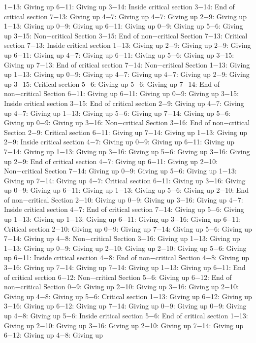 1−13: Giving up
6−11: Giving up
3−14: Inside critical section
3−14: End of critical section
7−13: Giving up
4−7: Giving up
4−7: Giving up
2−9: Giving up
1−13: Giving up
0−9: Giving up
6−11: Giving up
0−9: Giving up
5−6: Giving up
3−15: Non−critical Section
3−15: End of non−critical Section
7−13: Critical section
7−13: Inside critical section
1−13: Giving up
2−9: Giving up
2−9: Giving up
6−11: Giving up
4−7: Giving up
6−11: Giving up
5−6: Giving up
3−15: Giving up
7−13: End of critical section
7−14: Non−critical Section
1−13: Giving up
1−13: Giving up
0−9: Giving up
4−7: Giving up
4−7: Giving up
2−9: Giving up
3−15: Critical section
5−6: Giving up
5−6: Giving up
7−14: End of non−critical Section
6−11: Giving up
6−11: Giving up
0−9: Giving up
3−15: Inside critical section
3−15: End of critical section
2−9: Giving up
4−7: Giving up
4−7: Giving up
1−13: Giving up
5−6: Giving up
7−14: Giving up
5−6: Giving up
0−9: Giving up
3−16: Non−critical Section
3−16: End of non−critical Section
2−9: Critical section
6−11: Giving up
7−14: Giving up
1−13: Giving up
2−9: Inside critical section
4−7: Giving up
0−9: Giving up
6−11: Giving up
7−14: Giving up
1−13: Giving up
3−16: Giving up
5−6: Giving up
3−16: Giving up
2−9: End of critical section
4−7: Giving up
6−11: Giving up
2−10: Non−critical Section
7−14: Giving up
0−9: Giving up
5−6: Giving up
1−13: Giving up
7−14: Giving up
4−7: Critical section
6−11: Giving up
3−16: Giving up
0−9: Giving up
6−11: Giving up
1−13: Giving up
5−6: Giving up
2−10: End of non−critical Section
2−10: Giving up
0−9: Giving up
3−16: Giving up
4−7: Inside critical section
4−7: End of critical section
7−14: Giving up
5−6: Giving up
1−13: Giving up
1−13: Giving up
6−11: Giving up
3−16: Giving up
6−11: Critical section
2−10: Giving up
0−9: Giving up
7−14: Giving up
5−6: Giving up
7−14: Giving up
4−8: Non−critical Section
3−16: Giving up
1−13: Giving up
1−13: Giving up
0−9: Giving up
2−10: Giving up
2−10: Giving up
5−6: Giving up
6−11: Inside critical section
4−8: End of non−critical Section
4−8: Giving up
3−16: Giving up
7−14: Giving up
7−14: Giving up
1−13: Giving up
6−11: End of critical section
6−12: Non−critical Section
5−6: Giving up
6−12: End of non−critical Section
0−9: Giving up
2−10: Giving up
3−16: Giving up
2−10: Giving up
4−8: Giving up
5−6: Critical section
1−13: Giving up
6−12: Giving up
3−16: Giving up
6−12: Giving up
7−14: Giving up
0−9: Giving up
0−9: Giving up
4−8: Giving up
5−6: Inside critical section
5−6: End of critical section
1−13: Giving up
2−10: Giving up
3−16: Giving up
2−10: Giving up
7−14: Giving up
6−12: Giving up
4−8: Giving up
